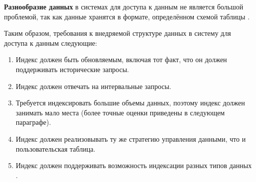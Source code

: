 \textbf{Разнообразие данных} в системах для доступа к данным не является большой проблемой, так как данные хранятся в формате, определённом схемой таблицы \cite{Hudi_SQL_DDL}.

Таким образом, требования к внедряемой структуре данных в систему для доступа к данным следующие:
\begin{enumerate}
    \item Индекс должен быть обновляемым, включая тот факт, что он должен поддерживать исторические запросы.
    \item Индекс должен отвечать на интервальные запросы.
    \item Требуется индексировать большие объемы данных, поэтому индекс должен занимать мало места (более точные оценки приведены в следующем параграфе).
    \item Индекс должен реализовывать ту же стратегию управления данными, что и пользовательская таблица.
    \item Индекс должен поддерживать возможность индексации разных типов данных .
\end{enumerate}
